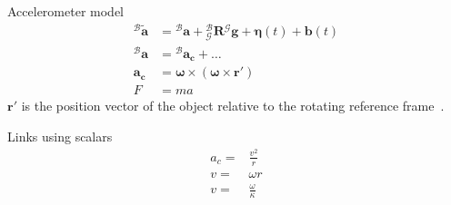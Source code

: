 \documentclass[12pt,letterpaper,oneside]{article}
\begin{document}
Accelerometer model
\begin{align*}
  {}^{\mathcal{B}}\mathbf{\tilde{a}} & = {}^{\mathcal{B}}\mathbf{a} + {}^{\mathcal{B}}_{\mathcal{G}}\mathbf{R} {}^{\mathcal{G}}\mathbf{g} + \mathbf{\eta}(t) + \mathbf{b}(t) \\
  {}^{\mathcal{B}}\mathbf{a} & = {}^{\mathcal{B}}\mathbf{a_c} + \dots \\
  \mathbf{a_c} & = \mathbf{\omega} \times (\mathbf{\omega} \times \mathbf{r'}) \\
  F & = ma
\end{align*}
$\mathbf{r'}$ is the position vector of the object relative to the rotating reference frame~\cite{wikiCoriolis}.

Links using scalars
\begin{align*}
  a_c = & \frac{v^2}{r} \\
  v = & \omega  r \\
  v = & \frac{\omega}{\kappa}
\end{align*}

\printbibliography
\end{document}
